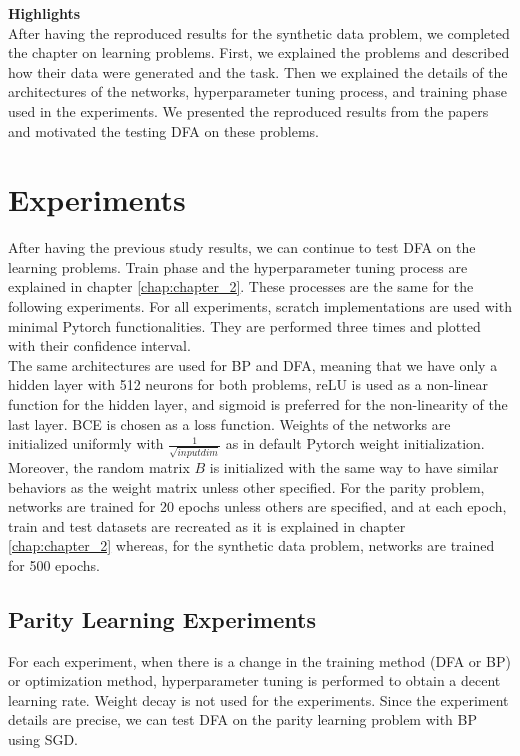 \documentclass[a4paper, nobind]{templates/ociamthesis}
\begin{document}
\noindent \textbf{Highlights}\\
After having the reproduced results for the synthetic data problem, we completed the chapter on learning problems. First, we explained the problems and described how their data were generated and the task. Then we explained the details of the architectures of the networks, hyperparameter tuning process, and training phase used in the experiments. We presented the reproduced results from the papers and motivated the testing DFA on these problems.

\hypertarget{chap:chapter_3}{%
\chapter{Experiments}\label{chap:chapter_3}}

\noindent After having the previous study results, we can continue to test DFA on the learning problems. Train phase and the hyperparameter tuning process are explained in chapter \ref{chap:chapter_2}. These processes are the same for the following experiments. For all experiments, scratch implementations are used with minimal Pytorch functionalities. They are performed three times and plotted with their confidence interval.\\
The same architectures are used for BP and DFA, meaning that we have only a hidden layer with 512 neurons for both problems, reLU is used as a non-linear function for the hidden layer, and sigmoid is preferred for the non-linearity of the last layer. BCE is chosen as a loss function. Weights of the networks are initialized uniformly with \(\frac{1}{\sqrt{input dim}}\) as in default Pytorch weight initialization. Moreover, the random matrix \(B\) is initialized with the same way to have similar behaviors as the weight matrix unless other specified. For the parity problem, networks are trained for 20 epochs unless others are specified, and at each epoch, train and test datasets are recreated as it is explained in chapter \ref{chap:chapter_2} whereas, for the synthetic data problem, networks are trained for 500 epochs.

\hypertarget{parity-learning-experiments}{%
\section{Parity Learning Experiments}\label{parity-learning-experiments}}

For each experiment, when there is a change in the training method (DFA or BP) or optimization method, hyperparameter tuning is performed to obtain a decent learning rate. Weight decay is not used for the experiments. Since the experiment details are precise, we can test DFA on the parity learning problem with BP using SGD.
\end{document}
